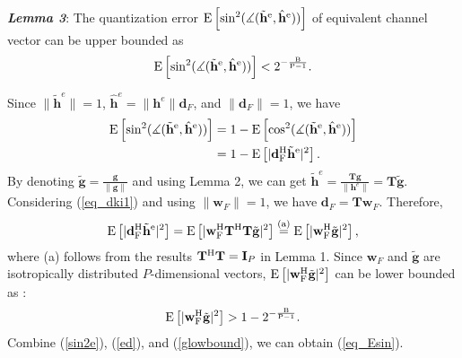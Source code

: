 \documentclass[10pt,twocolumn,twoside]{IEEEtran}
\DeclareMathOperator*{\argmax}{arg\,max}
\begin{document}
\textit{\textbf{Lemma 3}}: The quantization error $\rm{E}\left[ \sin^2(\measuredangle(\tilde{\mathbf{h}}^e,\hat{\mathbf{h}}^e))\right]$ of equivalent channel vector can be upper bounded as
\begin{align}\label{eq_Esin}
\rm{E}\left[ \sin^2(\measuredangle(\tilde{\mathbf{h}}^e,\hat{\mathbf{h}}^e))\right] <2^{-\frac{B}{P-1}}.
\end{align}
\begin{IEEEproof}
Since $\|\tilde{\mathbf{h}}^e\|=1$, $\hat{\mathbf{h}}^e=\|\mathbf{h}^e\|\mathbf{d}_F$, and $\|\mathbf{d}_F\|=1$, we have
\begin{align}\label{sin2e}
\rm{E}\left[ \sin^2(\measuredangle(\tilde{\mathbf{h}}^e,\hat{\mathbf{h}}^e))\right] & = 1-\rm{E}\left[ \cos^2(\measuredangle(\tilde{\mathbf{h}}^e,\hat{\mathbf{h}}^e))\right]  \\\nonumber
&=1-\rm{E}\left[ |\mathbf{d}_F^{\rm{H}}{\tilde{\mathbf{h}}^e}|^2\right].
\end{align}
By denoting $\tilde{\mathbf{g}}=\frac{\mathbf{g}}{\|\mathbf{g}\|}$ and using Lemma 2,
we can get $\tilde{\mathbf{h}}^e=\frac{\mathbf{T}\mathbf{g}}{\|\mathbf{h}^e\|}=\mathbf{T}\tilde{\mathbf{g}}$.
Considering (\ref{eq_dki1}) and using $\|\mathbf{w}_F\|=1$, we have $\mathbf{d}_F=\mathbf{T}\mathbf{w}_F$.
Therefore,
\begin{align}\label{ed}
\rm{E}\left[ |\mathbf{d}_F^{\rm{H}}{\tilde{\mathbf{h}}^e}|^2\right] =\rm{E}\left[ |\mathbf{w}_F^{\rm{H}}\mathbf{T}^{\rm{H}}\mathbf{T}\tilde{\mathbf{g}}|^2\right] \overset{(a)}{=}\rm{E}\left[ |\mathbf{w}_F^{\rm{H}}\tilde{\mathbf{g}}|^2\right],
\end{align}
where (a) follows from the results $\mathbf{T}^{\rm{H}}\mathbf{T}= \mathbf{I}_P$ in Lemma 1.
Since $\mathbf{w}_F$ and $\tilde{\mathbf{g}}$ are isotropically distributed $P$-dimensional vectors,
$\rm{E}\left[ |\mathbf{w}_F^{\rm{H}}\tilde{\mathbf{g}}|^2\right]$ can be lower bounded as \cite{TIT_NJindal_MIMOBroadcast}:
\begin{align}\label{glowbound}
\rm{E}\left[ |\mathbf{w}_F^{\rm{H}}\tilde{\mathbf{g}}|^2\right] >1-2^{-\frac{B}{P-1}}.
\end{align}
Combine (\ref{sin2e}), (\ref{ed}), and (\ref{glowbound}), we can obtain (\ref{eq_Esin}).
\end{IEEEproof}
\end{document}
